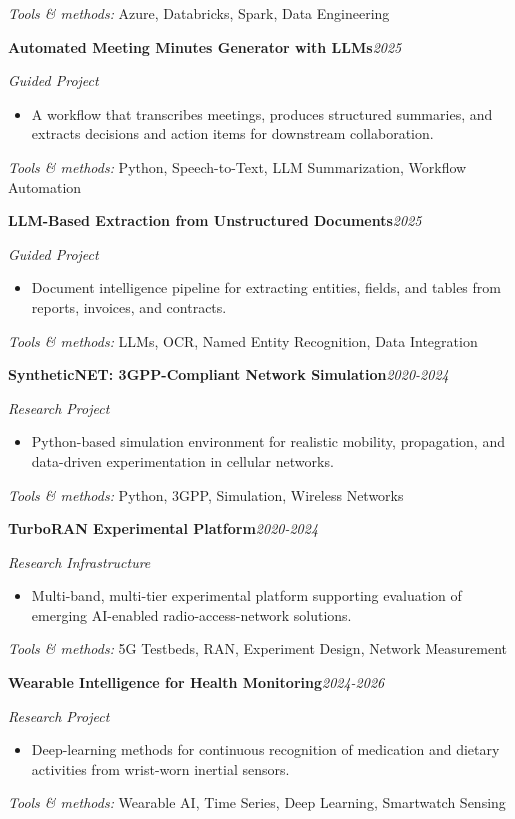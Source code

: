 \documentclass[9pt,letterpaper]{extarticle}
\newcommand{\entry}[2]{\Needspace{4\baselineskip}\textbf{#1}\hfill\textit{#2}\par}
\begin{document}
{\small\textit{Tools \& methods:} Azure, Databricks, Spark, Data Engineering\par}
\entry{Automated Meeting Minutes Generator with LLMs}{2025}
\textit{Guided Project}\par
\begin{itemize}
\item A workflow that transcribes meetings, produces structured summaries, and extracts decisions and action items for downstream collaboration.
\end{itemize}
{\small\textit{Tools \& methods:} Python, Speech-to-Text, LLM Summarization, Workflow Automation\par}
\entry{LLM-Based Extraction from Unstructured Documents}{2025}
\textit{Guided Project}\par
\begin{itemize}
\item Document intelligence pipeline for extracting entities, fields, and tables from reports, invoices, and contracts.
\end{itemize}
{\small\textit{Tools \& methods:} LLMs, OCR, Named Entity Recognition, Data Integration\par}
\entry{SyntheticNET: 3GPP-Compliant Network Simulation}{2020-2024}
\textit{Research Project}\par
\begin{itemize}
\item Python-based simulation environment for realistic mobility, propagation, and data-driven experimentation in cellular networks.
\end{itemize}
{\small\textit{Tools \& methods:} Python, 3GPP, Simulation, Wireless Networks\par}
\entry{TurboRAN Experimental Platform}{2020-2024}
\textit{Research Infrastructure}\par
\begin{itemize}
\item Multi-band, multi-tier experimental platform supporting evaluation of emerging AI-enabled radio-access-network solutions.
\end{itemize}
{\small\textit{Tools \& methods:} 5G Testbeds, RAN, Experiment Design, Network Measurement\par}
\entry{Wearable Intelligence for Health Monitoring}{2024-2026}
\textit{Research Project}\par
\begin{itemize}
\item Deep-learning methods for continuous recognition of medication and dietary activities from wrist-worn inertial sensors.
\end{itemize}
{\small\textit{Tools \& methods:} Wearable AI, Time Series, Deep Learning, Smartwatch Sensing\par}
\end{document}
